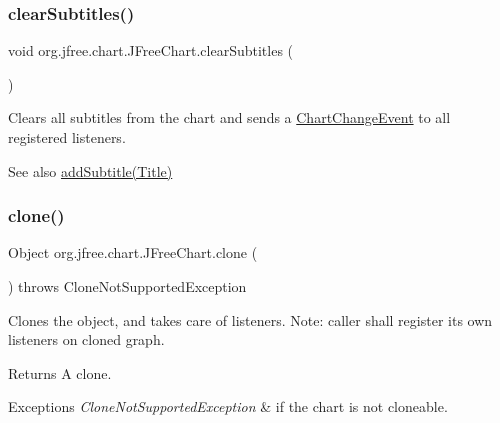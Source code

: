 \subsubsection{\texorpdfstring{clear\+Subtitles()}{clearSubtitles()}}
{\footnotesize\ttfamily void org.\+jfree.\+chart.\+J\+Free\+Chart.\+clear\+Subtitles (\begin{DoxyParamCaption}{ }\end{DoxyParamCaption})}

Clears all subtitles from the chart and sends a \mbox{\hyperlink{}{Chart\+Change\+Event}} to all registered listeners.

\begin{DoxySeeAlso}{See also}
\mbox{\hyperlink{classorg_1_1jfree_1_1chart_1_1_j_free_chart_a511d69d8b64444f31c59761a1c7ba8f8}{add\+Subtitle(\+Title)}} 
\end{DoxySeeAlso}
\mbox{\label{classorg_1_1jfree_1_1chart_1_1_j_free_chart_ae4727c826e3be11540387a1ae67e2aef}} 
\subsubsection{\texorpdfstring{clone()}{clone()}}
{\footnotesize\ttfamily Object org.\+jfree.\+chart.\+J\+Free\+Chart.\+clone (\begin{DoxyParamCaption}{ }\end{DoxyParamCaption}) throws Clone\+Not\+Supported\+Exception}

Clones the object, and takes care of listeners. Note\+: caller shall register its own listeners on cloned graph.

\begin{DoxyReturn}{Returns}
A clone.
\end{DoxyReturn}

\begin{DoxyExceptions}{Exceptions}
{\em Clone\+Not\+Supported\+Exception} & if the chart is not cloneable. \\
\hline
\end{DoxyExceptions}
\mbox{\label{classorg_1_1jfree_1_1chart_1_1_j_free_chart_ac210618938e02e783f41126ed748127b}} 
